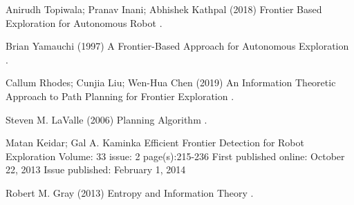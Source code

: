 \documentclass{article}
\begin{document}
\pagebreak

  
\begin{thebibliography}{1}


 Anirudh Topiwala; Pranav Inani; Abhishek Kathpal
\newblock (2018)
\newblock Frontier Based Exploration for Autonomous Robot
.

Brian Yamauchi
\newblock (1997)
\newblock  A Frontier-Based Approach for Autonomous Exploration
.

Callum Rhodes; Cunjia Liu; Wen-Hua Chen
\newblock (2019)
\newblock An Information Theoretic Approach to Path Planning for Frontier Exploration
.

Steven M. LaValle
\newblock (2006)
\newblock Planning Algorithm
.

Matan Keidar; Gal A. Kaminka
\newblock Efficient Frontier Detection for Robot Exploration
\newblock Volume: 33 issue: 2
\newblock page(s):215-236
\newblock First published online: October 22, 2013
\newblock Issue published: February 1, 2014

Robert M. Gray
\newblock (2013)
\newblock Entropy and Information Theory
.



\end{thebibliography}


\end{document}
